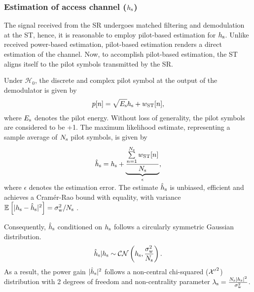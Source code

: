 
\subsubsection{Estimation of access channel ($h_{\text{s}}$)}
The signal received from the SR undergoes matched filtering and demodulation at the ST, hence, it is reasonable to employ pilot-based estimation for $h_{\text{s}}$. Unlike received power-based estimation, pilot-based estimation renders a direct estimation of the channel. Now, to accomplish pilot-based estimation, the ST aligns itself to the pilot symbols transmitted by the SR. 

Under $\mathcal H_0$, the discrete and complex pilot symbol at the output of the demodulator is given by \cite{Gifford08} 
\begin{align}
p[n] = \sqrt{E_{\text{s}}} h_{\text{s}} + w_{\text{ST}}[n], 
\label{eq_IS:pilot_sig}
\end{align}
where $E_{\text{s}}$ denotes the pilot energy. Without loss of generality, the pilot symbols are considered to be +1. The maximum likelihood estimate, representing a sample average of $N_{\text{s}}$ pilot symbols, is given by \cite{Gifford05}
\begin{align}
\hat{h}_{\text{s}} = h_{\text{s}} + \smash[b]{\underbrace{\frac{\sum\limits^{N_{\text{s}}}_{n=1} w_{\text{ST}}[n]}{N_{\text{s}}}}_{\epsilon}},
\label{eq_IS:pilot_MLE}
\end{align}\\[-0.00em]
where $\epsilon$ denotes the estimation error. 
The estimate $\hat{h}_{\text{s}}$ is unbiased, efficient and achieves a Cram\'er-Rao bound with equality, with variance ${\mathbb E}_{}\left[ |h_{\text{s}} -\hat{h}_{\text{s}}|^2 \right] = \sigma^2_{\text{w}}/N_{\text{s}}$ \cite{Gifford08}. 

Consequently, $\hat{h}_{\text{s}}$ conditioned on $h_{\text{s}}$ follows a circularly symmetric Gaussian distribution.
\begin{align}
\hat{h}_{\text{s}}|h_{\text{s}} \sim \mathcal{CN}\left( h_{\text{s}},\frac{\sigma^2_{\text{w}}}{N_{\text{s}}} \right).
\label{eq_IS:ehs} 
\end{align}
As a result, the power gain $|\hat{h}_{\text{s}}|^2$ follows a non-central chi-squared ($\ncchi2$) distribution with 2 degrees of freedom and non-centrality parameter $\lambda_{\text{s}} = \frac{N_{\text{s}} |h_{\text{s}}|^2}{\sigma^2_{\text{w}}}$.  

